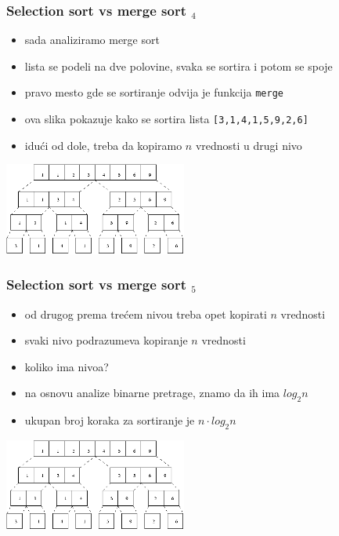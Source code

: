\documentclass[utf8,compress]{beamer}
\begin{document}
\begin{frame}[fragile]
  \frametitle{Selection sort vs merge sort $_4$}
  \begin{itemize}
    \item sada analiziramo merge sort
    \item lista se podeli na dve polovine, svaka se sortira i potom se spoje
    \item pravo mesto gde se sortiranje odvija je funkcija \texttt{merge}
    \item ova slika pokazuje kako se sortira lista \texttt{[3,1,4,1,5,9,2,6]}
    \item idući od dole, treba da kopiramo $n$ vrednosti u drugi nivo
  \end{itemize}
\begin{center}
  \includegraphics[width=6cm]{pic28}
\end{center}
\end{frame}

\begin{frame}[fragile]
  \frametitle{Selection sort vs merge sort $_5$}
  \begin{itemize}
    \item od drugog prema trećem nivou treba opet kopirati $n$ vrednosti
    \item svaki nivo podrazumeva kopiranje $n$ vrednosti
    \item koliko ima nivoa?
    \item na osnovu analize binarne pretrage, znamo da ih ima $log_2 n$
    \item ukupan broj koraka za sortiranje je $n\cdot log_2 n$
  \end{itemize}
\begin{center}
  \includegraphics[width=6cm]{pic28}
\end{center}
\end{frame}
\end{document}
